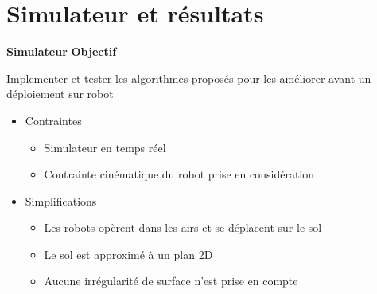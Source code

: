 \documentclass[aspectratio=169,10pt]{beamer}
\begin{document}
\section{Simulateur et résultats}

\begin{frame}{\textbf{Simulateur}}
	\textbf{Objectif}

	\vspace{0.5em}

	Implementer et tester les algorithmes proposés pour les améliorer avant un déploiement sur robot
	
	\vspace{0.5em}

	\begin{itemize}
		\item Contraintes
		\begin{itemize}
			\item Simulateur en temps réel
			\vspace{0.2cm}
			\item Contrainte cinématique du robot prise en considération
		\end{itemize}
		\vspace{0.2cm}
		\item Simplifications
		\begin{itemize}
			\item Les robots opèrent dans les airs et se déplacent sur le sol
			\vspace{0.2cm}
			\item Le sol est approximé à un plan 2D
			\vspace{0.2cm}
			\item Aucune irrégularité de surface n'est prise en compte
		\end{itemize}
	\end{itemize}
\end{frame}
\end{document}
